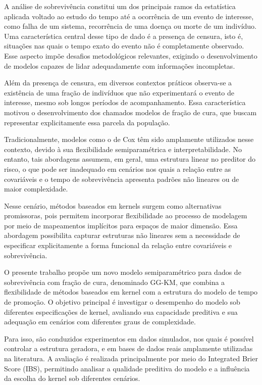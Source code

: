 A análise de sobrevivência constitui um dos principais ramos da estatística aplicada voltado ao estudo do
tempo até a ocorrência de um evento de interesse, como falha de um sistema, recorrência de uma doença ou
morte de um indivíduo. Uma característica central desse tipo de dado é a presença de censura, isto é,
situações nas quais o tempo exato do evento não é completamente observado. Esse aspecto impõe desafios
metodológicos relevantes, exigindo o desenvolvimento de modelos capazes de lidar adequadamente com
informações incompletas.

Além da presença de censura, em diversos contextos práticos observa-se a existência de uma fração de
indivíduos que não experimentará o evento de interesse, mesmo sob longos períodos de acompanhamento.
Essa característica motivou o desenvolvimento dos chamados modelos de fração de cura, que buscam representar
explicitamente essa parcela da população.

Tradicionalmente, modelos como o de Cox têm sido amplamente utilizados nesse contexto, devido à sua
flexibilidade semiparamétrica e interpretabilidade. No entanto, tais abordagens assumem, em geral, uma
estrutura linear no preditor do risco, o que pode ser inadequado em cenários nos quais a relação entre as
covariáveis e o tempo de sobrevivência apresenta padrões não lineares ou de maior complexidade.

Nesse cenário, métodos baseados em kernels surgem como alternativas promissoras, pois permitem incorporar
flexibilidade ao processo de modelagem por meio de mapeamentos implícitos para espaços de maior dimensão.
Essa abordagem possibilita capturar estruturas não lineares sem a necessidade de especificar explicitamente
a forma funcional da relação entre covariáveis e sobrevivência.

O presente trabalho propõe um novo modelo semiparamétrico para dados de sobrevivência com fração de cura,
denominado GG-KM, que combina a flexibilidade de métodos baseados em kernel com a estrutura do modelo de
tempo de promoção. O objetivo principal é investigar o desempenho do modelo sob diferentes especificações
de kernel, avaliando sua capacidade preditiva e sua adequação em cenários com diferentes graus de
complexidade.

Para isso, são conduzidos experimentos em dados simulados, nos quais é possível controlar a estrutura geradora,
e em bases de dados reais amplamente utilizadas na literatura. A avaliação é realizada principalmente por
meio do Integrated Brier Score (IBS), permitindo analisar a qualidade preditiva do modelo e a influência
da escolha do kernel sob diferentes cenários.

